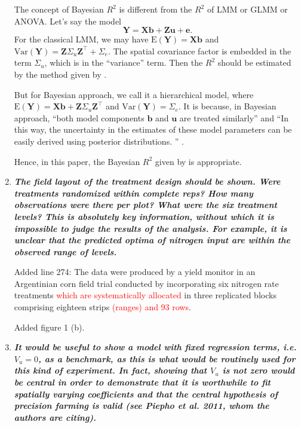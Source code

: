 \documentclass[a4paper]{article}   	%
\newcommand{\E}{\mathrm{E}}
\newcommand{\Var}{\mathrm{Var}}
\newcommand{\qtitle}[1]{\textit{\textbf{#1}}}
\begin{document}
\begin{enumerate}
    
    The concept of Bayesian $R^2$ is different from the $R^2$ of LMM or GLMM or ANOVA. Let's say the model
   	\begin{equation}\label{eq:modelmatrix}
    	\bm{Y} = \bm{X}\bm{b}+\bm{Z}\bm{u}+\bm{e}.
    \end{equation}
	For the classical LMM, we may have 
	$\E(\bm{Y}) = \bm{X}\bm{b}$ and $\Var(\bm{Y}) = \bm{Z}\Sigma_u\bm{Z}^\top+\Sigma_e$. The spatial covariance factor is embedded in the term $\Sigma_u$, which is in the ``variance'' term. Then the $R^2$ should be estimated by the method given by \textcite{Piepho2019Coefficient}. 
	
	But for Bayesian approach, we call it a hierarchical model, where $\E(\bm{Y}) = \bm{X}\bm{b} + \bm{Z}\Sigma_u\bm{Z}^\top$ and $\Var(\bm{Y}) = \Sigma_e$. It is because, in Bayesian approach, ``both model components $\bm{b}$ and $\bm{u}$ are treated similarly'' and ``In this way, the uncertainty in the estimates of these model parameters can be easily derived using posterior distributions. '' \parencite{Burkner2017Brms}. 

    Hence, in this paper, the Bayesian $R^2$ given by \textcite{Gelman2019Rsquared} is appropriate. 
    
    \item \qtitle{The field layout of the treatment design should be shown. Were treatments randomized within complete reps? How many observations were there per plot? What were the six treatment levels? This is absolutely key information, without which it is impossible to judge the results of the analysis. For example, it is unclear that the predicted optima of nitrogen input are within the observed range of levels.}

    Added line 274: The data were produced by a yield monitor in an Argentinian corn field trial conducted by incorporating six nitrogen rate treatments \textcolor{red}{which are systematically allocated} in three replicated blocks comprising eighteen strips \textcolor{red}{(ranges) and 93 rows}. 
    
    Added figure 1 (b). 
    
    \item \qtitle{It would be useful to show a model with fixed regression terms, i.e. $V_u = 0$, as a benchmark, as this is what would be routinely used for this kind of experiment. In fact, showing that $V_u$ is not zero would be central in order to demonstrate that it is worthwhile to fit spatially varying coefficients and that the central hypothesis of precision farming is valid (see Piepho et al. 2011, whom the authors are citing).}


\end{enumerate}
\end{document}
